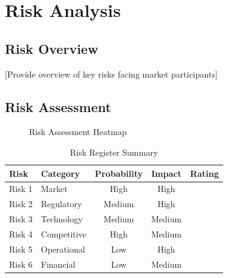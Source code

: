 \documentclass[11pt,letterpaper]{report}
\begin{document}
\chapter{Risk Analysis}

\section{Risk Overview}

[Provide overview of key risks facing market participants]

\section{Risk Assessment}


\begin{figure}[htbp]
\centering
\caption{Risk Assessment Heatmap}
\label{fig:risk_heatmap}
\end{figure}

\begin{table}[htbp]
\centering
\caption{Risk Register Summary}
\begin{tabular}{@{}llccl@{}}
\toprule
\textbf{Risk} & \textbf{Category} & \textbf{Probability} & \textbf{Impact} & \textbf{Rating} \\
\midrule
Risk 1 & Market & High & High & \riskhigh{} \\
\rowcolor{tablealt} Risk 2 & Regulatory & Medium & High & \riskhigh{} \\
Risk 3 & Technology & Medium & Medium & \riskmedium{} \\
\rowcolor{tablealt} Risk 4 & Competitive & High & Medium & \riskmedium{} \\
Risk 5 & Operational & Low & High & \riskmedium{} \\
\rowcolor{tablealt} Risk 6 & Financial & Low & Medium & \risklow{} \\
\bottomrule
\end{tabular}
\label{tab:risk_register}
\end{table}
\end{document}
